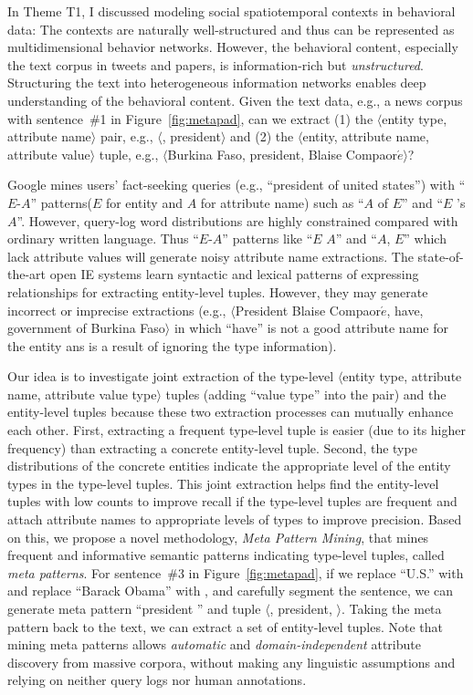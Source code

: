 \documentclass[10.5pt]{article}
\newcommand{\lb}{\mbox{$\langle$}}
\newcommand{\rb}{\mbox{$\rangle$}}
\newcommand{\pair}[2]{{\lb#1, #2\rb}\xspace}
\newcommand{\tuple}[3]{{\lb#1, #2, #3\rb}\xspace}
\newcommand{\eapatterns}{{``$E$-$A$'' patterns}\xspace}
\begin{document}
In Theme T1, I discussed modeling social spatiotemporal contexts in behavioral data: The contexts are naturally well-structured and thus can be represented as multidimensional behavior networks. However, the behavioral content, especially the text corpus in tweets and papers, is information-rich but \textit{unstructured}. Structuring the text into heterogeneous information networks enables deep understanding of the behavioral content. Given the text data, e.g., a news corpus with sentence~\#1 in Figure~\ref{fig:metapad}, can we extract (1) the \pair{entity type}{attribute name} pair, e.g., \pair{\cscountry}{president} and (2) the \tuple{entity}{attribute name}{attribute value} tuple, e.g., \tuple{Burkina Faso}{president}{Blaise Compaor$\acute{e}$}?

Google mines users' fact-seeking queries (e.g., ``president of united states'') with \eapatterns ($E$ for entity and $A$ for attribute name) such as ``$A$ of $E$'' and ``$E$ 's $A$''. However, query-log word distributions are highly constrained compared with ordinary written language. Thus \eapatterns like ``$E$ $A$'' and ``$A$, $E$'' which lack attribute values will generate noisy attribute name extractions. The state-of-the-art open IE systems learn syntactic and lexical patterns of expressing relationships for extracting entity-level tuples. However, they may generate incorrect or imprecise extractions (e.g., \tuple{President Blaise Compaor$\acute{e}$}{have}{government of Burkina Faso} in which ``have'' is not a good attribute name for the entity ans is a result of ignoring the type information).

Our idea is to investigate joint extraction of the type-level \tuple{entity type}{attribute name}{attribute value type} tuples (adding ``value type'' into the pair) and the entity-level tuples because these two extraction processes can mutually enhance each other. First, extracting a frequent type-level tuple is easier (due to its higher frequency) than extracting a concrete entity-level tuple. Second, the type distributions of the concrete entities indicate the appropriate level of the entity types in the type-level tuples. This joint extraction helps find the entity-level tuples with low counts to improve recall if the type-level tuples are frequent and attach attribute names to appropriate levels of types to improve precision. Based on this, we propose a novel methodology, \textit{Meta Pattern Mining}, that mines frequent and informative semantic patterns indicating type-level tuples, called \textit{meta patterns}. For sentence~\#3 in Figure~\ref{fig:metapad}, if we replace ``U.S.'' with \cscountry and replace ``Barack Obama'' with \cspolitician, and carefully segment the sentence, we can generate meta pattern ``\cscountry president \cspolitician'' and tuple \tuple{\cscountry}{president}{\cspolitician}. Taking the meta pattern back to the text, we can extract a set of entity-level tuples. Note that mining meta patterns allows \textit{automatic} and \textit{domain-independent} attribute discovery from massive corpora, without making any linguistic assumptions and relying on neither query logs nor human annotations.
\end{document}

